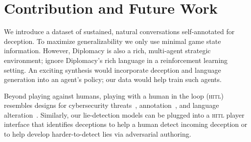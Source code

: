 \section{Contribution and Future Work}
\label{sec:contribution}


We introduce a dataset of sustained, natural conversations
self-annotated for deception.
%
To maximize generalizability we only use minimal game state information.
%
However, Diplomacy is also a rich, multi-agent strategic environment;
 ignore Diplomacy's rich language in
a reinforcement learning setting.
%
An exciting synthesis would incorporate deception and language
generation into an agent's policy; our data would help train such agents.

Beyond playing against humans, playing with a human in the loop
(\textsc{hitl}) resembles designs for cybersecurity
threats~\cite{cranor2008framework},
annotation~\cite{branson2010visual}, and language
alteration~\cite{wallace2019trick}.
%
Similarly, our lie-detection models can be plugged into a
\textsc{hitl} player interface that identifies
deceptions to help a human detect incoming deception or to
help develop harder-to-detect lies via adversarial
authoring.





